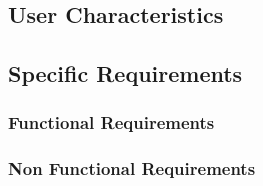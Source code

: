 \subsection{User Characteristics}
\blindtext[2]

\subsection{Specific Requirements}
    \blindtext[2]
    \subsubsection{Functional Requirements}
    \blindtext[1]
    \subsubsection{Non Functional Requirements}
    \blindtext[1]


